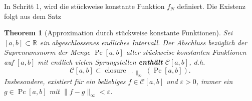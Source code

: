\documentclass[
]{book}
\newtheorem{theorem}{Theorem}[chapter]
\theoremstyle{definition}
\theoremstyle{definition}
\theoremstyle{definition}
\theoremstyle{definition}
\theoremstyle{remark}
\begin{document}
In Schritt 1, wird die stückweise konstante Funktion \(f_N\) definiert. Die
Existenz folgt aus dem Satz

\begin{theorem}[Approximation durch stückweise konstante Funktionen]
\protect\hypertarget{thm:thm-pc-dense-C}{}\label{thm:thm-pc-dense-C}Sei \([a, b]\subset \mathbb R^{}\) ein abgeschlossenes endliches Intervall.
Der Abschluss bezüglich der Supremumsnorm der Menge \(\operatorname{Pc}[a, b]\) aller stückweise konstanten Funktionen auf \([a, b]\) mit endlich vielen Sprungstellen \textbf{enthält} \(\mathcal C[a, b]\), d.h.
\begin{equation*}
\mathcal{C}[a, b]\subset \operatorname{closure}_{\|\cdot\|_\infty}(\operatorname{Pc}[a, b]).
\end{equation*}
Insbesondere, existiert für ein beliebiges \(f\in \mathcal C[a, b]\) und \(\varepsilon > 0\), immer ein \(g\in \operatorname{Pc}[a, b]\) mit \(\|f-g\|_\infty<\varepsilon\).
\end{theorem}
\end{document}
